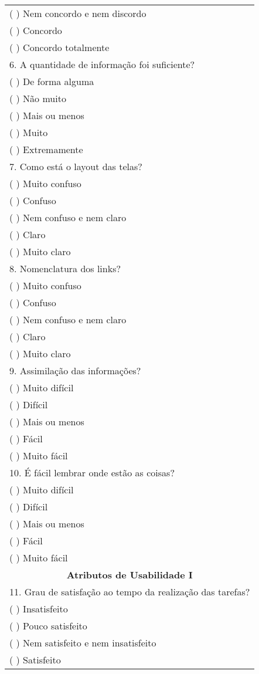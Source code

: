 \begin{center}
\begin{longtable}{l}
(  ) Nem concordo e nem discordo \\ 
(  ) Concordo \\ 
(  ) Concordo totalmente \\ 
6. A quantidade de informação foi suficiente?  \\ 
(  ) De forma alguma \\ 
(  ) Não muito \\ 
(  ) Mais ou menos \\ 
(  ) Muito \\ 
(  ) Extremamente \\ 
7. Como está o layout das telas?  \\ 
(  ) Muito confuso \\ 
(  ) Confuso \\ 
(  ) Nem confuso e nem claro \\ 
(  ) Claro \\ 
(  ) Muito claro \\ 
8. Nomenclatura dos links?  \\ 
(  ) Muito confuso \\ 
(  ) Confuso \\ 
(  ) Nem confuso e nem claro \\ 
(  ) Claro \\ 
(  ) Muito claro \\ 
9. Assimilação das informações?  \\ 
(  ) Muito difícil \\ 
(  ) Difícil \\ 
(  ) Mais ou menos \\ 
(  ) Fácil \\ 
(  ) Muito fácil \\ 
10. É fácil lembrar onde estão as coisas?  \\ 
(  ) Muito difícil \\ 
(  ) Difícil \\ 
(  ) Mais ou menos \\ 
(  ) Fácil \\ 
(  ) Muito fácil \\ 
\multicolumn{1}{c}{\textbf{Atributos de Usabilidade I}} \\ 
11. Grau de satisfação ao tempo da realização das tarefas?  \\ 
(  ) Insatisfeito \\ 
(  ) Pouco satisfeito \\ 
(  ) Nem satisfeito e nem insatisfeito \\ 
(  ) Satisfeito \\ 

\end{longtable}
\end{center}
